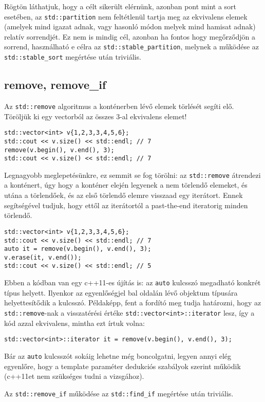 \documentclass[a4paper,11.5pt,table]{article}
\begin{document}
	Rögtön láthatjuk, hogy a célt sikerült elérnünk, azonban pont mint a sort esetében, az \texttt{std::partition} nem feltétlenül tartja meg az ekvivalens elemek (amelyek mind igazat adnak, vagy hasonló módon melyek mind hamisat adnak) relatív sorrendjét. Ez nem is mindig cél, azonban ha fontos hogy megőrződjön a sorrend, használható e célra az \texttt{std::stable\_partition}, melynek a működése az \texttt{std::stable\_sort} megértése után triviális.
	\subsection{remove, remove\_if}
	Az \texttt{std::remove} algoritmus a konténerben lévő elemek törlését segíti elő. Töröljük ki egy vectorból az összes 3-al ekvivalens elemet!
	\begin{lstlisting}
std::vector<int> v{1,2,3,3,4,5,6};
std::cout << v.size() << std::endl; // 7
remove(v.begin(), v.end(), 3);
std::cout << v.size() << std::endl; // 7
	\end{lstlisting}
	Legnagyobb meglepetésünkre, ez semmit se fog törölni: az \texttt{std::remove} átrendezi a konténert, úgy hogy a konténer elején legyenek a nem törlendő elemeket, és utána a törlendőek, és az első törlendő elemre visszaad egy iterátort. Ennek segítségével tudjuk, hogy ettől az iterátortól a past-the-end iteratorig minden törlendő.
	\begin{lstlisting}
std::vector<int> v{1,2,3,3,4,5,6};
std::cout << v.size() << std::endl; // 7
auto it = remove(v.begin(), v.end(), 3);
v.erase(it, v.end());
std::cout << v.size() << std::endl; // 5
	\end{lstlisting}
	\begin{note}
		Ebben a kódban van egy c++11-es újítás is: az \texttt{auto} kulcsszó megadható konkrét típus helyett. Ilyenkor az egyenlőségjel bal oldalán lévő objektum típusára helyettesítődik a kulcsszó. Példaképp, fent a fordító meg tudja határozni, hogy az \texttt{std::remove}-nak a visszatérési értéke \texttt{std::vector<int>::iterator} lesz, így a kód azzal ekvivalens, mintha ezt írtuk volna:
		
		{\centering\texttt{std::vector<int>::iterator it = remove(v.begin(), v.end(), 3);} \par}
		
		Bár az \texttt{auto} kulcsszót sokáig lehetne még boncolgatni, legyen annyi elég egyenlőre, hogy a template paraméter dedukciós szabályok szerint működik (c++11et nem szükséges tudni a vizsgához).
	\end{note}
	Az \texttt{std::remove\_if} működése az \texttt{std::find\_if} megértése után triviális.
	
\end{document}
